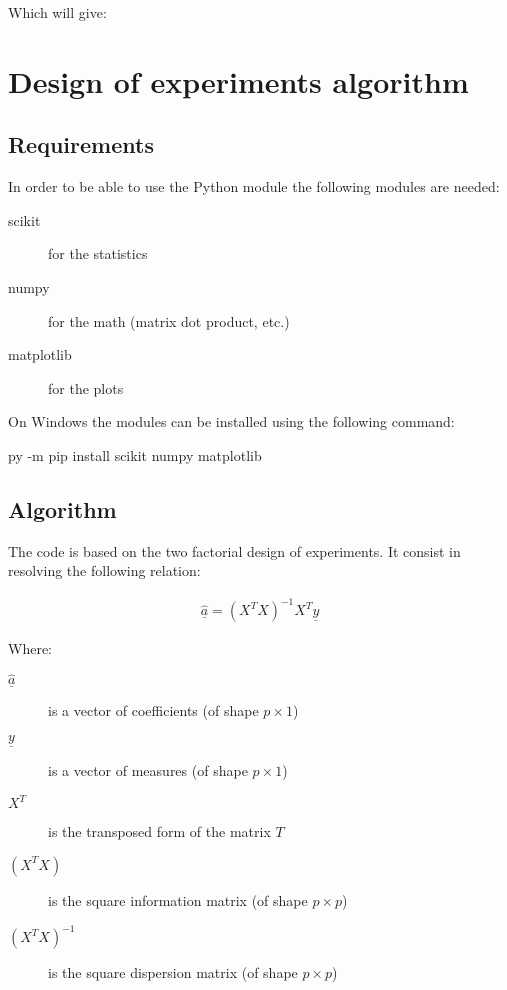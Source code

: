 \documentclass[english, 12 pt, openany, oneside]{book}
\begin{document}

Which will give:


\textquote{\printpythontex}

\section{Design of experiments algorithm}


\subsection{Requirements}
In order to be able to use the Python module the following modules are needed:

\begin{description}
\item[scikit] for the statistics
\item[numpy] for the math (matrix dot product, etc.)
\item[matplotlib] for the plots
\end{description}

On Windows the modules can be installed using the following command:
\begin{pyverbatim}
py -m pip install scikit numpy matplotlib
\end{pyverbatim}

\subsection{Algorithm}
The code is based on the two factorial design of experiments. It consist in resolving the following relation:

\begin{align*}
\hat{\underline{a}} = \left(X^T X\right)^{-1} X^T \underline{y}
\end{align*}

\noindent Where: 

\begin{description}
\item[$\hat{\underline{a}}$] is a vector of coefficients (of shape $p\times 1$)
\item[$\underline{y}$] is a vector of measures (of shape $p\times 1$)
\item[$X^T$] is the transposed form of the matrix $T$
\item[$\left(X^T X\right)$] is the square information matrix (of shape $p\times p$)
\item[$\left(X^T X\right)^{-1}$] is the square dispersion matrix (of shape $p\times p$)
\end{description}
\end{document}
